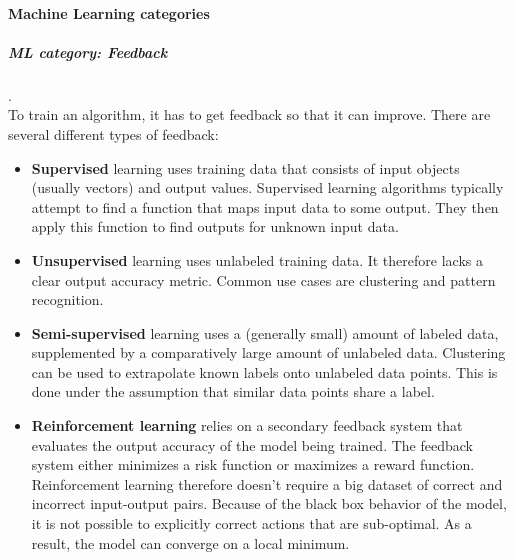 \paragraph{Machine Learning categories}
\subparagraph{ML category: Feedback}
.\\
To train an algorithm, it has to get feedback so that it can improve. There are several different types of feedback:
\begin{itemize}
	\item \textbf{Supervised}
		learning uses training data that consists of input objects (usually vectors) and output values. Supervised learning algorithms typically attempt to find a function that maps input data to some output. They then apply this function to find outputs for unknown input data.
	\item \textbf{Unsupervised}
		learning uses unlabeled training data. It therefore lacks a clear output accuracy metric. Common use cases are clustering and pattern recognition.
	\item \textbf{Semi-supervised}
		learning uses a (generally small) amount of labeled data, supplemented by a comparatively large amount of unlabeled data. Clustering can be used to extrapolate known labels onto unlabeled data points. This is done under the assumption that similar data points share a label.
	\item \textbf{Reinforcement learning}
		relies on a secondary feedback system that evaluates the output accuracy of the model being trained. The feedback system either minimizes a risk function or maximizes a reward function. Reinforcement learning therefore doesn't require a big dataset of correct and incorrect input-output pairs. Because of the black box behavior of the model, it is not possible to explicitly correct actions that are sub-optimal. As a result, the model can converge on a local minimum.
\end{itemize}

